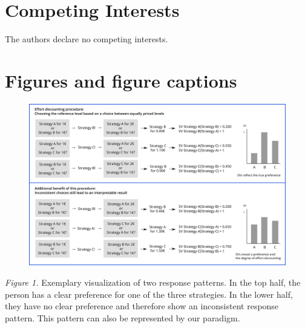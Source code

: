 \documentclass[
  man,floatsintext]{apa6}
\begin{document}
\hypertarget{competing-interests}{%
\section{Competing Interests}\label{competing-interests}}

The authors declare no competing interests.

\newpage
\setcounter{figure}{0}

\hypertarget{figures-and-figure-captions}{%
\section{Figures and figure captions}\label{figures-and-figure-captions}}

\newpage

\begin{figure}
\includegraphics[width=\textwidth]{figures/Paradigm_Scheme_T2} \caption{ }\label{fig:ResponsePatternsAppendix}
\end{figure}

\emph{Figure 1.} Exemplary visualization of two response patterns.
In the top half, the person has a clear preference for one of the three strategies.
In the lower half, they have no clear preference and therefore show an inconsistent response pattern.
This pattern can also be represented by our paradigm.
\end{document}
